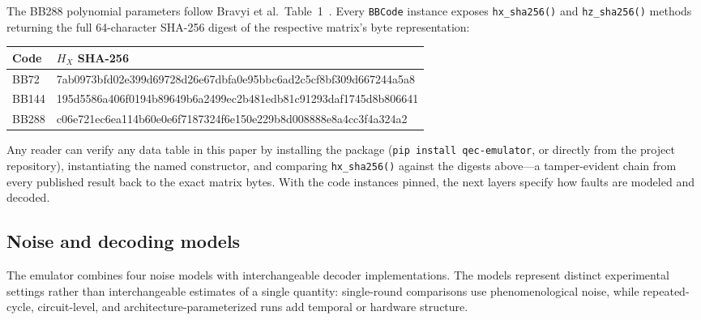 \documentclass[pdflatex,sn-mathphys-num]{sn-jnl}
\theoremstyle{thmstyleone}
\theoremstyle{thmstyletwo}
\theoremstyle{thmstylethree}
\begin{document}
\noindent
The BB288 polynomial parameters follow Bravyi et al.\ Table~1~\cite{Bravyi2024}. Every \texttt{BBCode} instance exposes \texttt{hx\_sha256()} and \texttt{hz\_sha256()} methods returning the full 64-character SHA-256 digest of the respective matrix's byte representation:

\begin{center}
\small\ttfamily
\begin{tabular}{@{}ll@{}}
\toprule
Code & $H_X$ SHA-256 \\
\midrule
BB72  & 7ab0973bfd02e399d69728d26e67dbfa0e95bbc6ad2c5cf8bf309d667244a5a8 \\
BB144 & 195d5586a406f0194b89649b6a2499ec2b481edb81c91293daf1745d8b806641 \\
BB288 & c06e721ec6ea114b60e0e6f7187324f6e150e229b8d008888e8a4cc3f4a324a2 \\
\bottomrule
\end{tabular}
\end{center}

\noindent
Any reader can verify any data table in this paper by installing the package (\texttt{pip install qec-emulator}, or directly from the project repository), instantiating the named constructor, and comparing \texttt{hx\_sha256()} against the digests above---a tamper-evident chain from every published result back to the exact matrix bytes. With the code instances pinned, the next layers specify how faults are modeled and decoded.

\subsection{Noise and decoding models}
\label{ssec:decoder-layer}

The emulator combines four noise models with interchangeable decoder implementations. The models represent distinct experimental settings rather than interchangeable estimates of a single quantity: single-round comparisons use phenomenological noise, while repeated-cycle, circuit-level, and architecture-parameterized runs add temporal or hardware structure.
\end{document}
